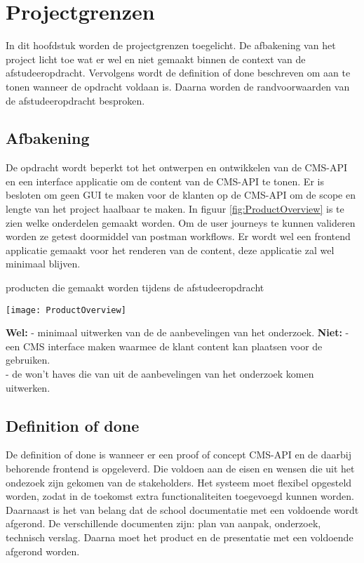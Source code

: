 \chapter{Projectgrenzen}
In dit hoofdstuk worden de projectgrenzen toegelicht.
De afbakening van het project licht toe wat er wel en niet gemaakt binnen de context van de afstudeeropdracht.
Vervolgens wordt de definition of done beschreven om aan te tonen wanneer de opdracht voldaan is.
Daarna worden de randvoorwaarden van de afstudeeropdracht besproken.
\section{Afbakening}
De opdracht wordt beperkt tot het ontwerpen en ontwikkelen van de \gls{CMS}-API en een interface applicatie om de content van de \gls{CMS}-API te tonen.
Er is besloten om geen \gls{GUI} te maken voor de klanten op de \gls{CMS}-API om de scope en lengte van het project haalbaar te maken.
In figuur \ref{fig:ProductOverview} is te zien welke onderdelen gemaakt worden.
Om de user journeys te kunnen valideren worden ze getest doormiddel van postman workflows.
Er wordt wel een frontend applicatie gemaakt voor het renderen van de content, deze applicatie zal wel minimaal blijven.
\begin{graphic}
    \captionsetup{type=figure}
    \caption{producten die gemaakt worden tijdens de afstudeeropdracht}
    \texttt{[image: ProductOverview]}
    \label{fig:ProductOverview}
\end{graphic}
\whitespace
\textbf{Wel:}
\whitespace
- minimaal uitwerken van de  de aanbevelingen van het onderzoek.
\textbf{Niet:}
\whitespace
- een \gls{CMS} interface maken waarmee de klant content kan plaatsen voor de gebruiken.\\
- de won't haves die van uit de aanbevelingen van het onderzoek komen uitwerken.
\section{Definition of done}
De definition of done is wanneer er een proof of concept CMS-API en de daarbij behorende frontend is opgeleverd. 
Die voldoen aan de eisen en wensen die uit het ondezoek zijn gekomen van de stakeholders.
Het systeem moet flexibel opgesteld worden, zodat in de toekomst extra functionaliteiten toegevoegd kunnen worden.
Daarnaast is het van belang dat de school documentatie met een voldoende wordt afgerond.
De verschillende documenten zijn: plan van aanpak, onderzoek, technisch verslag.
Daarna moet het product en de presentatie met een voldoende afgerond worden.
